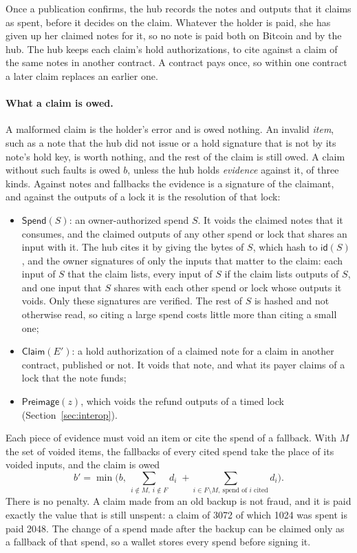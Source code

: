 \documentclass[11pt]{article}
\newcommand{\id}{\mathsf{id}}
\newcommand{\bresp}{b'}
\begin{document}
Once a publication confirms, the hub records the notes and outputs that it claims as spent, before it decides on the claim. Whatever the holder is paid, she has given up her claimed notes for it, so no note is paid both on Bitcoin and by the hub. The hub keeps each claim's hold authorizations, to cite against a claim of the same notes in another contract. A contract pays once, so within one contract a later claim replaces an earlier one.

\paragraph{What a claim is owed.} A malformed claim is the holder's error and is owed nothing. An invalid \emph{item}, such as a note that the hub did not issue or a hold signature that is not by its note's hold key, is worth nothing, and the rest of the claim is still owed. A claim without such faults is owed $b$, unless the hub holds \emph{evidence} against it, of three kinds. Against notes and fallbacks the evidence is a signature of the claimant, and against the outputs of a lock it is the resolution of that lock:
\begin{itemize}[leftmargin=1.5em, itemsep=0pt]
\item $\mathsf{Spend}(S)$: an owner-authorized spend $S$. It voids the claimed notes that it consumes, and the claimed outputs of any other spend or lock that shares an input with it. The hub cites it by giving the bytes of $S$, which hash to $\id(S)$, and the owner signatures of only the inputs that matter to the claim: each input of $S$ that the claim lists, every input of $S$ if the claim lists outputs of $S$, and one input that $S$ shares with each other spend or lock whose outputs it voids. Only these signatures are verified. The rest of $S$ is hashed and not otherwise read, so citing a large spend costs little more than citing a small one;
\item $\mathsf{Claim}(E')$: a hold authorization of a claimed note for a claim in another contract, published or not. It voids that note, and what its payer claims of a lock that the note funds;
\item $\mathsf{Preimage}(z)$, which voids the refund outputs of a timed lock (Section~\ref{sec:interop}).
\end{itemize}
Each piece of evidence must void an item or cite the spend of a fallback. With $M$ the set of voided items, the fallbacks of every cited spend take the place of its voided inputs, and the claim is owed
\[
\bresp = \min\Big(b,\ \sum_{i \notin M,\ i \notin F} d_i \;+ \sum_{i \in F \setminus M,\ \text{spend of } i \text{ cited}} d_i\Big).
\]
There is no penalty. A claim made from an old backup is not fraud, and it is paid exactly the value that is still unspent: a claim of 3072 of which 1024 was spent is paid 2048. The change of a spend made after the backup can be claimed only as a fallback of that spend, so a wallet stores every spend before signing it.
\end{document}
